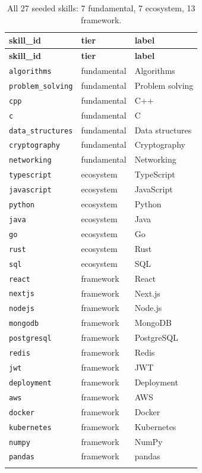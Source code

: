 \documentclass[10pt,a4paper]{article}
\begin{document}
\begin{longtable}{@{}llL{7.3cm}@{}}
\toprule
\textbf{skill\_id} & \textbf{tier} & \textbf{label} \\
\midrule
\endfirsthead
\toprule
\textbf{skill\_id} & \textbf{tier} & \textbf{label} \\
\midrule
\endhead
\texttt{algorithms}      & fundamental & Algorithms \\
\texttt{problem\_solving} & fundamental & Problem solving \\
\texttt{cpp}              & fundamental & C++ \\
\texttt{c}                & fundamental & C \\
\texttt{data\_structures} & fundamental & Data structures \\
\texttt{cryptography}     & fundamental & Cryptography \\
\texttt{networking}       & fundamental & Networking \\
\texttt{typescript}       & ecosystem & TypeScript \\
\texttt{javascript}       & ecosystem & JavaScript \\
\texttt{python}           & ecosystem & Python \\
\texttt{java}             & ecosystem & Java \\
\texttt{go}               & ecosystem & Go \\
\texttt{rust}             & ecosystem & Rust \\
\texttt{sql}              & ecosystem & SQL \\
\texttt{react}            & framework & React \\
\texttt{nextjs}           & framework & Next.js \\
\texttt{nodejs}           & framework & Node.js \\
\texttt{mongodb}          & framework & MongoDB \\
\texttt{postgresql}       & framework & PostgreSQL \\
\texttt{redis}            & framework & Redis \\
\texttt{jwt}              & framework & JWT \\
\texttt{deployment}       & framework & Deployment \\
\texttt{aws}              & framework & AWS \\
\texttt{docker}           & framework & Docker \\
\texttt{kubernetes}       & framework & Kubernetes \\
\texttt{numpy}            & framework & NumPy \\
\texttt{pandas}           & framework & pandas \\
\bottomrule
\caption{All 27 seeded skills: 7 fundamental, 7 ecosystem, 13 framework.}
\end{longtable}
\end{document}
